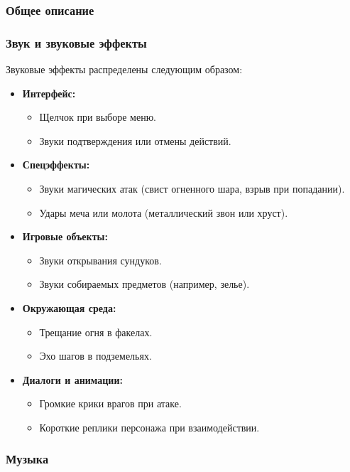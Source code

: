 \documentclass{article}
\begin{document}
\subsubsection{Общее описание}
\subsubsection{Звук и звуковые эффекты}
Звуковые эффекты распределены следующим образом:
\begin{itemize}
    \item \textbf{Интерфейс:}
    \begin{itemize}
        \item Щелчок при выборе меню.
        \item Звуки подтверждения или отмены действий.
    \end{itemize}
    \item \textbf{Спецэффекты:}
    \begin{itemize}
        \item Звуки магических атак (свист огненного шара, взрыв при попадании).
        \item Удары меча или молота (металлический звон или хруст).
    \end{itemize}
    \item \textbf{Игровые объекты:}
    \begin{itemize}
        \item Звуки открывания сундуков.
        \item Звуки собираемых предметов (например, зелье).
    \end{itemize}
    \item \textbf{Окружающая среда:}
    \begin{itemize}
        \item Трещание огня в факелах.
        \item Эхо шагов в подземельях.
    \end{itemize}
    \item \textbf{Диалоги и анимации:}
    \begin{itemize}
        \item Громкие крики врагов при атаке.
        \item Короткие реплики персонажа при взаимодействии.
    \end{itemize}
\end{itemize}
\subsubsection{Музыка}
\end{document}
